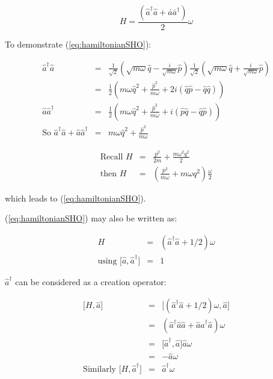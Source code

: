 \begin{equation}
  H = \frac{\left(\hat{a}^{\dagger}\hat{a} + \bar{a}\bar{a}^{\dagger}\right)}{2}\omega \label{eq:hamiltonianSHO}
\end{equation}

To demonstrate (\ref{eq:hamiltonianSHO}):

\begin{eqnarray*}
  \hat{a}^{\dagger}\hat{a} & = & \frac{1}{\sqrt{2}}\left(\sqrt{m\omega}\hat{q} - \frac{i}{\sqrt{m\omega}}\hat{p}\right)\frac{1}{\sqrt{2}}\left(\sqrt{m\omega}\hat{q} + \frac{i}{\sqrt{m\omega}}\hat{p}\right) \\
  & = & \frac{1}{2}\left(m\omega\hat{q}^2 + \frac{\hat{p}^2}{m\omega} + 2i\left(\hat{q}\hat{p} - \hat{q}\hat{q}\right)\right) \\
  \hat{a}\hat{a}^{\dagger} & = & \frac{1}{2}\left(m\omega \hat{q}^2 + \frac{\hat{p}^2}{m\omega} + i\left(\hat{p}\hat{q} - \hat{q}\hat{p}\right)\right) \\
  \textrm{So } \hat{a}^{\dagger}\hat{a} + \hat{a}\hat{a}^{\dagger} & = & m\omega \hat{q}^2 + \frac{\hat{p}^2}{m\omega}
\end{eqnarray*}

\begin{eqnarray*}
  \textrm{Recall } H & = & \frac{p^2}{2m} + \frac{m\omega^2q^2}{2} \\
  \textrm{then } H & = & \left( \frac{p^2}{m\omega} + m\omega q^2 \right) \frac{\omega}{2}
\end{eqnarray*}

which leads to (\ref{eq:hamiltonianSHO}).

(\ref{eq:hamiltonianSHO}) may also be written as:

\begin{eqnarray*}
  H & = & \left( \hat{a}^{\dagger} \hat{a} + 1/2 \right)\omega \\
  \textrm{using } \lbrack \hat{a},\hat{a}^{\dagger} \rbrack & = & 1
\end{eqnarray*}

$\hat{a}^{\dagger}$ can be considered as a creation operator:

\begin{eqnarray*}
  \lbrack H,\hat{a} \rbrack & = & \lbrack \left(\hat{a}^{\dagger}\hat{a} + 1/2 \right)\omega , \hat{a} \rbrack \\
  & = & \left(\hat{a}^{\dagger}\hat{a}\hat{a} + \hat{a}\hat{a}^{\dagger}\hat{a} \right)\omega \\
  & = & \lbrack\hat{a}^{\dagger},\hat{a}\rbrack\hat{a}\omega \\
  & = & -\hat{a}\omega \\
  \textrm{Similarly } \lbrack H,\hat{a}^{\dagger}\rbrack & = & \hat{a}^{\dagger} \omega
\end{eqnarray*}

